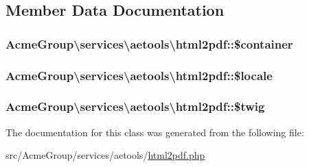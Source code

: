 \subsection{Member Data Documentation}
\hypertarget{class_acme_group_1_1services_1_1aetools_1_1html2pdf_ab2f9d51ae95931d4c0bf10c253014ae2}{
\subsubsection[{\$container}]{\setlength{\rightskip}{0pt plus 5cm}Acme\+Group\textbackslash{}services\textbackslash{}aetools\textbackslash{}html2pdf\+::\$container\hspace{0.3cm}{\ttfamily [protected]}}}\label{class_acme_group_1_1services_1_1aetools_1_1html2pdf_ab2f9d51ae95931d4c0bf10c253014ae2}
\hypertarget{class_acme_group_1_1services_1_1aetools_1_1html2pdf_a31895609923796f657530aaffdbc1523}{
\subsubsection[{\$locale}]{\setlength{\rightskip}{0pt plus 5cm}Acme\+Group\textbackslash{}services\textbackslash{}aetools\textbackslash{}html2pdf\+::\$locale\hspace{0.3cm}{\ttfamily [protected]}}}\label{class_acme_group_1_1services_1_1aetools_1_1html2pdf_a31895609923796f657530aaffdbc1523}
\hypertarget{class_acme_group_1_1services_1_1aetools_1_1html2pdf_afd529755f5297ccdb88cbc79bbd53c5a}{
\subsubsection[{\$twig}]{\setlength{\rightskip}{0pt plus 5cm}Acme\+Group\textbackslash{}services\textbackslash{}aetools\textbackslash{}html2pdf\+::\$twig\hspace{0.3cm}{\ttfamily [protected]}}}\label{class_acme_group_1_1services_1_1aetools_1_1html2pdf_afd529755f5297ccdb88cbc79bbd53c5a}


The documentation for this class was generated from the following file\+:\begin{DoxyCompactItemize}
\item 
src/\+Acme\+Group/services/aetools/\hyperlink{html2pdf_8php}{html2pdf.\+php}\end{DoxyCompactItemize}
